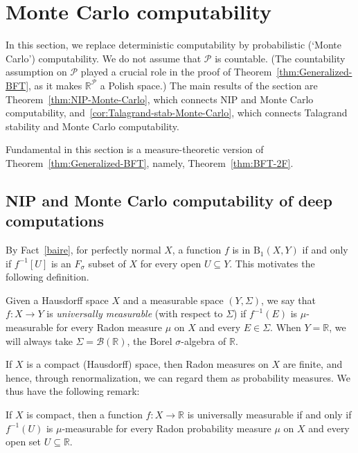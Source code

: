 
\section{Monte Carlo computability}\label{sec:measure-theoretic-NIP}

In this section, we replace deterministic computability by probabilistic (`Monte Carlo') computability.
We do not assume that $\mathcal{P}$ is countable.
(The countability assumption on $\mathcal{P}$ played a crucial role in the proof of Theorem~\ref{thm:Generalized-BFT}, as it makes $\mathbb{R}^\mathcal{P}$ a Polish space.)
The main results of the section are Theorem~\ref{thm:NIP-Monte-Carlo}, which connects NIP and Monte Carlo computability, and~\ref{cor:Talagrand-stab-Monte-Carlo}, which connects Talagrand stability and Monte Carlo computability.

Fundamental in this section is a measure-theoretic version of Theorem~\ref{thm:Generalized-BFT}, namely, Theorem~\ref{thm:BFT-2F}.

\subsection{NIP and Monte Carlo computability of deep computations}

By Fact~\ref{baire}, for perfectly normal $X$, a function $f$ is in $\mathrm{B}_1(X,Y)$ if and only if $f^{-1}[U]$ is an $F_\sigma$ subset of $X$ for every open $U\subseteq Y$.
This motivates the following definition.

\begin{definition}\label{def:universal-measurability}
    Given a Hausdorff space $X$ and a measurable space $(Y,\Sigma)$, we say that $f\colon X\to Y$ is \emph{universally measurable} (with respect to $\Sigma$) if $f^{-1}(E)$ is $\mu$-measurable for every Radon measure $\mu$ on $X$ and every $E\in\Sigma$.
    When $Y=\mathbb{R}$, we will always take $\Sigma=\mathcal{B}(\mathbb{R})$, the Borel $\sigma$-algebra of $\mathbb{R}$.
\end{definition}

If $X$ is a compact (Hausdorff) space, then Radon measures on $X$ are finite, and hence, through renormalization, we can regard them as probability measures.
We thus have the following remark:

\begin{remark}\label{rem:probability}
If $X$ is compact, then a function $f\colon X\to\mathbb{R}$ is universally measurable if and only if $f^{-1}(U)$ is $\mu$-measurable for every Radon probability measure $\mu$ on $X$ and every open set $U\subseteq\mathbb{R}$.
\end{remark}

